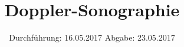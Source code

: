 


\subject{US3}
\title{Doppler-Sonographie}
\date{
	Durchführung: 16.05.2017
	\hspace{4em}
	Abgabe: 23.05.2017
}


	\maketitle
	\newpage
	\tableofcontents
	\newpage
	
	
	
	
	
	
	\newpage
	
	\printbibliography


